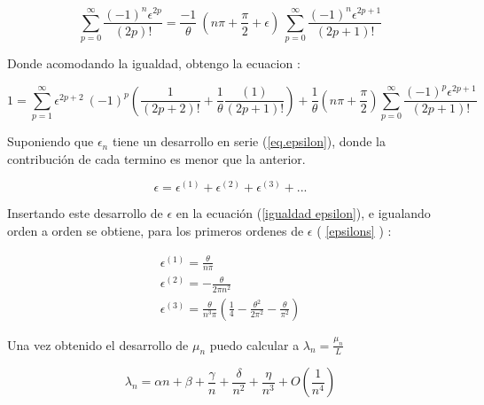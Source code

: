 \begin{equation}
         \sum _{p=0} ^{\infty} \frac{(-1) ^n  \epsilon ^{2 p }}{(2p)!} 
    =  \frac{-1}{\theta}  \ (n \pi + \frac{\pi}{2} + \epsilon ) \
     \sum _{p=0} ^{\infty} \frac{(-1) ^n \epsilon ^{2 p + 1}}{(2p+1)!} 
\end{equation}


Donde acomodando la igualdad, obtengo la ecuacion :

\begin{equation}
    1 = \sum _{p=1} ^{\infty} \epsilon ^{2p+2} \ (-1) ^p
    \left( 
    \frac{1}{(2p+2)!} + \frac{1}{\theta} \frac{(1 )}{(2p+1)!} 
    \right ) +
    \frac{1}{\theta} \left(n \pi + \frac{\pi}{2} \right)
    \sum _{p=0} ^{\infty} \frac{(-1) ^p \epsilon ^{2p+1}}{(2p+1) !}
\label{igualdad epsilon}
\end{equation}

Suponiendo que $\epsilon _n $ tiene un desarrollo en serie (\ref{eq.epsilon}), donde la contribución de cada termino es menor que la anterior.

\begin{equation}
    \epsilon = 
    \epsilon ^{(1)}  + 
    \epsilon ^{(2)}  + 
    \epsilon ^{(3)}  + ...
\label{eq.epsilon}
\end{equation}


Insertando este desarrollo de $\epsilon$ en la ecuación (\ref{igualdad epsilon}), e igualando orden a orden se obtiene, para los primeros ordenes de $\epsilon$ ( \ref{epsilons} ) :

\begin{equation}
\begin{array}{cc}
    \epsilon ^{(1)} = \frac{\theta}{n \pi} \\
    \epsilon ^{(2)} = - \frac{ \theta}{2 \pi n ^2 } \\
    \epsilon ^{(3)} = \frac{\theta}{n^3 \pi} 
        \left( \frac{1}{4} - 
        \frac{\theta ^2}{2 \pi ^2} -
        \frac{\theta}{\pi ^2}
        \right) 
\end{array}
\label{epsilons}
\end{equation}

Una vez obtenido el desarrollo de $\mu _n $ puedo calcular a $\lambda _n = \frac{\mu _n }{L}  $ 



\begin{equation}
    \lambda _n = 
    \alpha n + 
    \beta + 
    \frac{\gamma}{n} +
    \frac{\delta}{n ^2} +
    \frac{\eta}{n^3} +
    O(\frac{1}{n^4} ) 
\end{equation}
    
